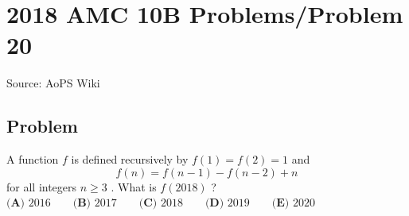 \documentclass[12pt]{article}
\begin{document}
\section*{{2018 AMC 10B Problems/Problem 20}}
Source: AoPS Wiki

\subsection*{Problem}
A function $f$ is defined recursively by $f(1)=f(2)=1$ and \[f(n)=f(n-1)-f(n-2)+n\] for all integers $n \geq 3$ . What is $f(2018)$ ? $\textbf{(A) } 2016 \qquad \textbf{(B) } 2017 \qquad \textbf{(C) } 2018 \qquad \textbf{(D) } 2019 \qquad \textbf{(E) } 2020$
\end{document}
